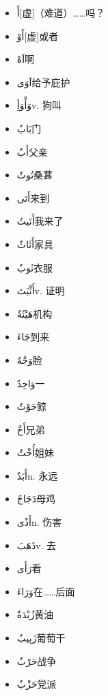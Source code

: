 \begin{itemize}
    \item {} \ac{أَ}{[虚]（难道）……吗？}
    \item \ac{أَوْ}{[虚]或者}
    \item \ac{آهْ}{啊}
    \item \ac{آوَى}{给予庇护}
    \item \ac{وَأْوَأِ}{v. 狗叫}

    \item {} \ac{بَابٌ}{门}
    \item \ac{أَبٌ}{父亲}
    \item \ac{تُوتٌ}{桑葚}
    \item \ac{أَتَى}{来到}
    \item \ac{أَتَيتُ}{我来了}
    \item \ac{أَثَاثٌ}{家具}
    \item \ac{ثَوبٌ}{衣服}
    \item \ac{أَثْبَتَ}{v. 证明}
    \item \ac{هَيْئَةٌ}{机构}

    \item {} \ac{جَاءَ}{到来}
    \item \ac{وَجْهٌ}{脸}
    \item \ac{وَاحِدٌ}{一}
    \item \ac{حَوْتٌ}{鲸}
    \item \ac{أَخٌ}{兄弟}
    \item \ac{أُخْتٌ}{姐妹}
    \item \ac{أَبَدٌ}{n. 永远}
    \item \ac{دَجَاجٌ}{母鸡}
    \item \ac{أَذًى}{n. 伤害}
    \item \ac{ذَهَبَ}{v. 去}
    \item \ac{رَأَى}{看}
    \item \ac{وَرَاءَ}{在……后面}
    \item \ac{زُبْدَةٌ}{黄油}
    \item \ac{زَبِيبٌ}{葡萄干}
    \item \ac{حَرْبٌ}{战争}
    \item \ac{حَزْبٌ}{党派}
    

\end{itemize}
